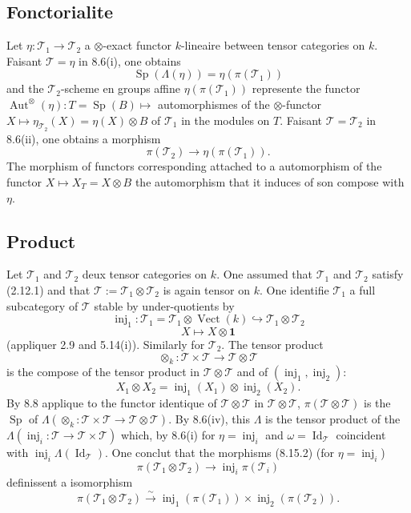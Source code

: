 \documentclass[12pt,a4paper]{article}
\theoremstyle{plain}
\theoremstyle{definition}
\DeclareMathOperator{\Sp}{Sp}
\DeclareMathOperator{\Aut}{Aut}
\DeclareMathOperator{\Id}{Id}
\DeclareMathOperator{\Vect}{Vect}
\DeclareMathOperator{\inj}{inj}
\begin{document}
\subsection{Fonctorialite}

Let $\eta : \mathcal{T}_1 \to \mathcal{T}_2$ a $\otimes$-exact functor $k$-lineaire between tensor categories on $k$. Faisant $\mathcal{T} = \eta$ in 8.6(i), one obtains
\begin{equation}\label{eq:8.15.1}
\Sp(\Lambda(\eta)) = \eta(\pi(\mathcal{T}_1))
\end{equation}
and the $\mathcal{T}_2$-scheme en groups affine $\eta(\pi(\mathcal{T}_1))$ represente the functor $\Aut^\otimes(\eta) : T = \Sp(B) \mapsto$ automorphismes of the $\otimes$-functor $X \mapsto \eta_{\mathcal{T}_2}(X) = \eta(X) \otimes B$ of $\mathcal{T}_1$ in the modules on $T$. Faisant $\mathcal{T} = \mathcal{T}_2$ in 8.6(ii), one obtains a morphism
\begin{equation}\label{eq:8.15.2}
\pi(\mathcal{T}_2) \to \eta(\pi(\mathcal{T}_1)).
\end{equation}
The morphism of functors corresponding attached to a automorphism of the functor $X \mapsto X_T = X \otimes B$ the automorphism that it induces of son compose with $\eta$.

\subsection{Product}

Let $\mathcal{T}_1$ and $\mathcal{T}_2$ deux tensor categories on $k$. One assumed that $\mathcal{T}_1$ and $\mathcal{T}_2$ satisfy (2.12.1) and that $\mathcal{T} := \mathcal{T}_1 \otimes \mathcal{T}_2$ is again tensor on $k$. One identifie $\mathcal{T}_1$ a full subcategory of $\mathcal{T}$ stable by under-quotients by
\[
\inj_1 : \mathcal{T}_1 = \mathcal{T}_1 \otimes \Vect(k) \hookrightarrow \mathcal{T}_1 \otimes \mathcal{T}_2
\]
\[
X \mapsto X \otimes \mathbf{1}
\]
(appliquer 2.9 and 5.14(i)). Similarly for $\mathcal{T}_2$. The tensor product
\[
\otimes_k : \mathcal{T} \times \mathcal{T} \to \mathcal{T} \otimes \mathcal{T}
\]
is the compose of the tensor product in $\mathcal{T} \otimes \mathcal{T}$ and of $(\inj_1, \inj_2)$:
\[
X_1 \otimes X_2 = \inj_1(X_1) \otimes \inj_2(X_2).
\]
By 8.8 applique to the functor identique of $\mathcal{T} \otimes \mathcal{T}$ in $\mathcal{T} \otimes \mathcal{T}$, $\pi(\mathcal{T} \otimes \mathcal{T})$ is the $\Sp$ of $\Lambda(\otimes_k : \mathcal{T} \times \mathcal{T} \to \mathcal{T} \otimes \mathcal{T})$. By 8.6(iv), this $\Lambda$ is the tensor product of the $\Lambda(\inj_i : \mathcal{T} \to \mathcal{T} \times \mathcal{T})$ which, by 8.6(i) for $\eta = \inj_i$ and $\omega = \Id_\mathcal{T}$ coincident with $\inj_i \Lambda(\Id_\mathcal{T})$. One conclut that the morphisms (8.15.2) (for $\eta = \inj_i$)
\[
\pi(\mathcal{T}_1 \otimes \mathcal{T}_2) \to \inj_i \pi(\mathcal{T}_i)
\]
definissent a isomorphism
\begin{equation}\label{eq:8.16.1}
\pi(\mathcal{T}_1 \otimes \mathcal{T}_2) \xrightarrow{\sim} \inj_1(\pi(\mathcal{T}_1)) \times \inj_2(\pi(\mathcal{T}_2)).
\end{equation}
\end{document}
